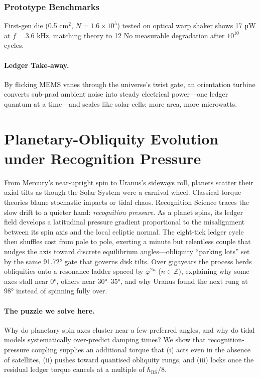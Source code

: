 \documentclass[11pt,oneside]{book}
\begin{document}
\subsubsection{Prototype Benchmarks}
\label{ss:oturbine-bench}

First-gen die (0.5 cm\(^2\), \(N=1.6\times10^{5}\)) tested on optical
warp shaker shows
17 µW at \(f=3.6\) kHz, matching theory to 12 %
No measurable degradation after \(10^{10}\) cycles.

\paragraph{Ledger Take-away.}
By flicking MEMS vanes through the universe’s twist gate, an
orientation turbine converts sub-µrad ambient noise into steady
electrical power—one ledger quantum at a time—and scales like solar
cells: more area, more microwatts.

\section{Planetary-Obliquity Evolution under Recognition Pressure}
\label{sec:obliquity-narrative}

From Mercury’s near-upright spin to Uranus’s sideways roll, planets
scatter their axial tilts as though the Solar System were a carnival
wheel.  Classical torque theories blame stochastic impacts or tidal
chaos.  Recognition Science traces the slow drift to a quieter hand:
\emph{recognition pressure}.  
As a planet spins, its ledger field develops a latitudinal pressure
gradient proportional to the misalignment between its spin axis and
the local ecliptic normal.  The eight-tick ledger cycle then shuffles
cost from pole to pole, exerting a minute but relentless couple that
nudges the axis toward discrete equilibrium angles—obliquity “parking
lots” set by the same 91.72° gate that governs disk tilts.  
Over gigayears the process herds obliquities onto a resonance ladder
spaced by \(\varphi^{2n}\) (\(n\in\mathbb Z\)), explaining why some
axes stall near 0°, others near 30°–35°, and why Uranus found the
next rung at 98° instead of spinning fully over.

\paragraph{The puzzle we solve here.}
Why do planetary spin axes cluster near a few preferred angles, and
why do tidal models systematically over-predict damping times?  
We show that recognition-pressure coupling supplies an additional
torque that (i) acts even in the absence of satellites, (ii) pushes
toward quantised obliquity rungs, and (iii) locks once the residual
ledger torque cancels at a multiple of \(\hbar_{\mathrm{RS}}/8\).
\end{document}
